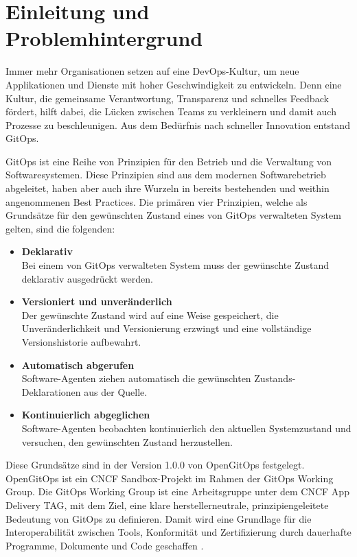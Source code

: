 \chapter{Einleitung und Problemhintergrund}


Immer mehr Organisationen setzen auf 
eine DevOps-Kultur, um neue Applikationen und Dienste mit hoher Geschwindigkeit zu entwickeln. 
Denn eine Kultur, die gemeinsame Verantwortung, Transparenz und schnelles Feedback fördert, 
hilft dabei, die Lücken zwischen Teams zu verkleinern und damit auch Prozesse zu beschleunigen.
Aus dem Bedürfnis nach schneller Innovation entstand GitOps.
\bigskip


GitOps ist eine Reihe von Prinzipien für den Betrieb und die Verwaltung von Softwaresystemen.
Diese Prinzipien sind aus dem modernen Softwarebetrieb abgeleitet, haben aber auch ihre Wurzeln 
in bereits bestehenden und weithin angenommenen Best Practices. Die primären vier Prinzipien,
welche als Grundsätze für den gewünschten Zustand eines
von GitOps verwalteten System gelten, sind die folgenden:

\begin{itemize}
	\item \textbf{Deklarativ} \\
		Bei einem von GitOps verwalteten System muss der gewünschte Zustand deklarativ ausgedrückt werden.
	\item \textbf{Versioniert und unveränderlich} \\
		Der gewünschte Zustand wird auf eine Weise gespeichert, die Unveränderlichkeit und Versionierung erzwingt und eine vollständige Versionshistorie aufbewahrt.
	\item \textbf{Automatisch abgerufen} \\
		Software-Agenten ziehen automatisch die gewünschten Zustands-Deklarationen aus der Quelle.
	\item \textbf{Kontinuierlich abgeglichen} \\
		Software-Agenten beobachten kontinuierlich den aktuellen Systemzustand und versuchen, den gewünschten Zustand herzustellen.
\end{itemize}

\autocite{gitopsPrinciplesv100}
\bigskip

Diese Grundsätze sind in der Version 1.0.0 von OpenGitOps festgelegt.
OpenGitOps ist ein CNCF Sandbox-Projekt im Rahmen der GitOps Working Group.
Die GitOps Working Group ist eine Arbeitsgruppe unter
dem CNCF App Delivery TAG,
mit dem Ziel, eine klare herstellerneutrale,
prinzipiengeleitete Bedeutung von GitOps zu definieren.
Damit wird eine Grundlage für die Interoperabilität zwischen Tools, Konformität und Zertifizierung durch dauerhafte Programme, Dokumente und Code geschaffen
\autocite{opengitopsDocuments}.
\bigskip

